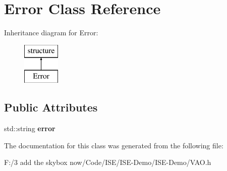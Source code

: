 \hypertarget{class_error}{\section{Error Class Reference}
\label{class_error}
}
Inheritance diagram for Error\-:\begin{figure}[H]
\begin{center}
\leavevmode
\includegraphics[height=2.000000cm]{class_error}
\end{center}
\end{figure}
\subsection*{Public Attributes}
\begin{DoxyCompactItemize}
\item 
\hypertarget{class_error_a7ca1958fd4898587d70b88c0c0dc0695}{std\-::string {\bfseries error}}\label{class_error_a7ca1958fd4898587d70b88c0c0dc0695}

\end{DoxyCompactItemize}


The documentation for this class was generated from the following file\-:\begin{DoxyCompactItemize}
\item 
F\-:/3 add the skybox now/\-Code/\-I\-S\-E/\-I\-S\-E-\/\-Demo/\-I\-S\-E-\/\-Demo/V\-A\-O.\-h\end{DoxyCompactItemize}
